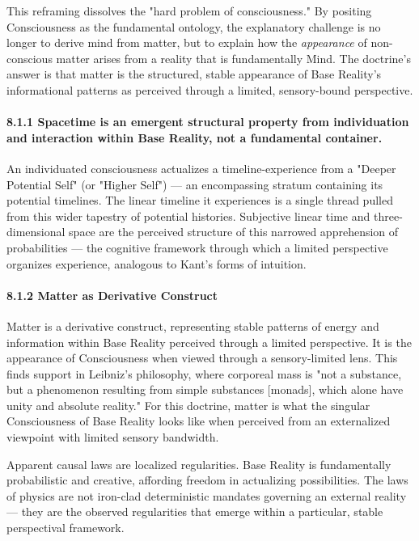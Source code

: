 This reframing dissolves the "hard problem of consciousness." By positing Consciousness as the fundamental ontology, the explanatory challenge is no longer to derive mind from matter, but to explain how the \textit{appearance} of non-conscious matter arises from a reality that is fundamentally Mind. The doctrine's answer is that matter is the structured, stable appearance of Base Reality's informational patterns as perceived through a limited, sensory-bound perspective.


\paragraph*{8.1.1 Spacetime is an emergent structural property from individuation and interaction within Base Reality, not a fundamental container.}


An individuated consciousness actualizes a timeline-experience from a "Deeper Potential Self" (or "Higher Self") — an encompassing stratum containing its potential timelines. The linear timeline it experiences is a single thread pulled from this wider tapestry of potential histories. Subjective linear time and three-dimensional space are the perceived structure of this narrowed apprehension of probabilities — the cognitive framework through which a limited perspective organizes experience, analogous to Kant's forms of intuition.


\paragraph*{8.1.2 Matter as Derivative Construct}


Matter is a derivative construct, representing stable patterns of energy and information within Base Reality perceived through a limited perspective. It is the appearance of Consciousness when viewed through a sensory-limited lens. This finds support in Leibniz's philosophy, where corporeal mass is "not a substance, but a phenomenon resulting from simple substances [monads], which alone have unity and absolute reality." For this doctrine, matter is what the singular Consciousness of Base Reality looks like when perceived from an externalized viewpoint with limited sensory bandwidth.


Apparent causal laws are localized regularities. Base Reality is fundamentally probabilistic and creative, affording freedom in actualizing possibilities. The laws of physics are not iron-clad deterministic mandates governing an external reality — they are the observed regularities that emerge within a particular, stable perspectival framework.


